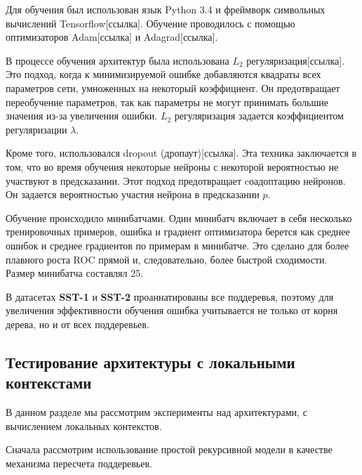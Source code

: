 Для обучения был использован язык Python 3.4 и фреймворк символьных вычислений Tensorflow[ссылка].
Обучение проводилось с помощью оптимизаторов Adam[ссылка] и Adagrad[ссылка].

В процессе обучения архитектур была использована $L_2$ регуляризация[ссылка].
Это подход, когда к минимизируемой ошибке добавляются квадраты всех параметров сети, умноженных на некоторый коэффициент.
Он предотвращает переобучение параметров, так как параметры не могут принимать большие значения из-за увеличения ошибки.
$L_2$ регуляризация задается коэффициентом регуляризации $\lambda$.

Кроме того, использовался dropout (дропаут)[ссылка]. 
Эта техника заключается в том, что во время обучения некоторые нейроны с некоторой вероятностью не участвуют в предсказании.
Этот подход предотвращает cоадоптацию нейронов. Он задается вероятностью участия нейрона в предсказании $p$.

Обучение происходило минибатчами. Один минибатч включает в себя несколько тренировочных примеров, ошибка и градиент оптимизатора
берется как среднее ошибок и среднее градиентов по примерам в минибатче. Это сделано для более плавного роста ROC прямой и, следовательно, более быстрой сходимости. Размер минибатча составлял 25.

В датасетах \textbf{SST-1} и \textbf{SST-2} проаннатированы все поддеревья, 
поэтому для увеличения эффективности обучения ошибка учитывается не только от корня дерева, но и от всех поддеревьев.

\subsection{Тестирование архитектуры с локальными контекстами}
В данном разделе мы рассмотрим эксперименты над архитектурами, с вычислением локальных контекстов.

Сначала рассмотрим использование простой рекурсивной модели в качестве механизма пересчета поддеревьев.

